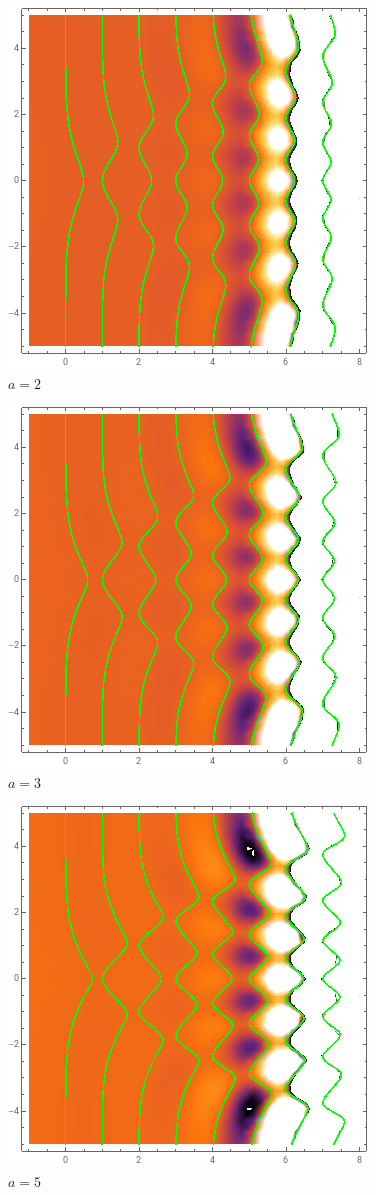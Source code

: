 \begin{figure}[h!]
    \centering
    \includegraphics{../img/dirac_2.png}
    \caption{$a=2$}
\end{figure}
\begin{figure}[h!]
    \centering
    \includegraphics{../img/dirac_3.png}
    \caption{$a=3$}
\end{figure}
\begin{figure}[h!]
    \centering
    \includegraphics{../img/dirac_5.png}
    \caption{$a=5$}
\end{figure}

